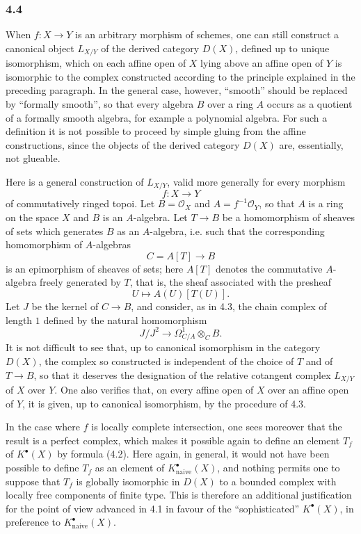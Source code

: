 \documentclass[11pt]{article}
\begin{document}
\subsubsection*{4.4}
When $f:X\to Y$ is an arbitrary morphism of schemes, one can still construct a canonical object $L_{X/Y}$ of the derived category $D(X)$, defined up to unique isomorphism, which on each affine open of $X$ lying above an affine open of $Y$ is isomorphic to the complex constructed according to the principle explained in the preceding paragraph. In the general case, however, ``smooth'' should be replaced by ``formally smooth'', so that every algebra $B$ over a ring $A$ occurs as a quotient of a formally smooth algebra, for example a polynomial algebra. For such a definition it is not possible to proceed by simple gluing from the affine constructions, since the objects of the derived category $D(X)$ are, essentially, not glueable.

Here is a general construction of $L_{X/Y}$, valid more generally for every morphism
\[
f:X\longrightarrow Y
\]
of commutatively ringed topoi. Let $B=\mathcal O_X$ and $A=f^{-1}\mathcal O_Y$, so that $A$ is a ring on the space $X$ and $B$ is an $A$-algebra. Let $T\to B$ be a homomorphism of sheaves of sets which generates $B$ as an $A$-algebra, i.e. such that the corresponding homomorphism of $A$-algebras
\[
C=A[T]\longrightarrow B
\]
is an epimorphism of sheaves of sets; here $A[T]$ denotes the commutative $A$-algebra freely generated by $T$, that is, the sheaf associated with the presheaf
\[
U\longmapsto A(U)[T(U)].
\]
Let $J$ be the kernel of $C\to B$, and consider, as in 4.3, the chain complex of length $1$ defined by the natural homomorphism
\[
J/J^2\longrightarrow \Omega^1_{C/A}\otimes_C B.
\]
It is not difficult to see that, up to canonical isomorphism in the category $D(X)$, the complex so constructed is independent of the choice of $T$ and of $T\to B$, so that it deserves the designation of the relative cotangent complex $L_{X/Y}$ of $X$ over $Y$. One also verifies that, on every affine open of $X$ over an affine open of $Y$, it is given, up to canonical isomorphism, by the procedure of 4.3.

In the case where $f$ is locally complete intersection, one sees moreover that the result is a perfect complex, which makes it possible again to define an element $T_f$ of $K^\bullet(X)$ by formula (4.2). Here again, in general, it would not have been possible to define $T_f$ as an element of $K^\bullet_{\mathrm{naive}}(X)$, and nothing permits one to suppose that $T_f$ is globally isomorphic in $D(X)$ to a bounded complex with locally free components of finite type. This is therefore an additional justification for the point of view advanced in 4.1 in favour of the ``sophisticated'' $K^\bullet(X)$, in preference to $K^\bullet_{\mathrm{naive}}(X)$.
\end{document}

